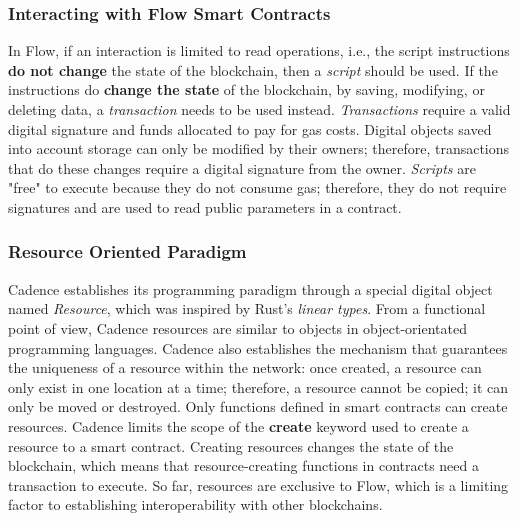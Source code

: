 \documentclass[../NFTComp_IEEE.tex]{subfiles}
\begin{document}
\subsubsection{Interacting with Flow Smart Contracts}
In Flow, if an interaction is limited to read operations, i.e., the script instructions \textbf{do not change} the state of the blockchain, then a \textit{script} should be used. If the instructions do \textbf{change the state} of the blockchain, by saving, modifying, or deleting data, a \textit{transaction} needs to be used instead. \textit{Transactions} require a valid digital signature and funds allocated to pay for gas costs. Digital objects saved into account storage can only be modified by their owners; therefore, transactions that do these changes require a digital signature from the owner. \textit{Scripts} are "free" to execute because they do not consume gas; therefore, they do not require signatures and are used to read public parameters in a contract.

\subsubsection{Resource Oriented Paradigm}
Cadence establishes its programming paradigm through a special digital object named \textit{Resource}, which was inspired by Rust's \textit{linear types}. From a functional point of view, Cadence resources are similar to objects in object-orientated programming languages. Cadence also establishes the mechanism that guarantees the uniqueness of a resource within the network: once created, a resource can only exist in one location at a time; therefore, a resource cannot be copied; it can only be moved or destroyed. Only functions defined in smart contracts can create resources. Cadence limits the scope of the \textbf{create} keyword used to create a resource to a smart contract. Creating resources changes the state of the blockchain, which means that resource-creating functions in contracts need a transaction to execute. So far, resources are exclusive to Flow, which is a limiting factor to establishing interoperability with other blockchains.
\end{document}
